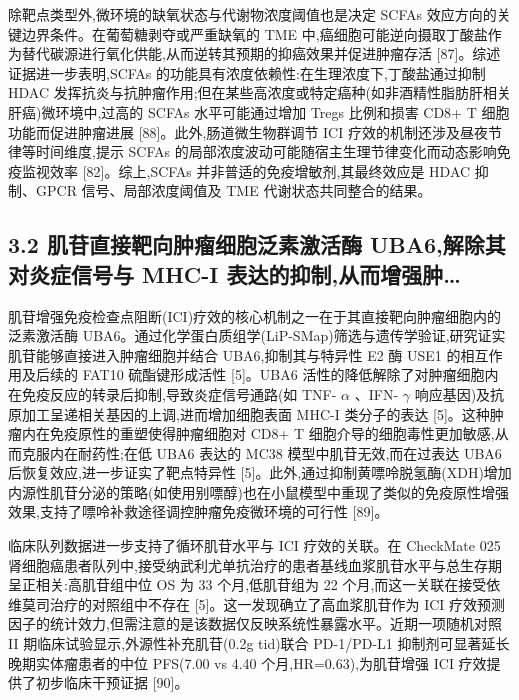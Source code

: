 \documentclass[11pt]{article}
\begin{document}
除靶点类型外,微环境的缺氧状态与代谢物浓度阈值也是决定 SCFAs 效应方向的关键边界条件。在葡萄糖剥夺或严重缺氧的 TME 中,癌细胞可能逆向摄取丁酸盐作为替代碳源进行氧化供能,从而逆转其预期的抑癌效果并促进肿瘤存活 {[}87{]}。综述证据进一步表明,SCFAs 的功能具有浓度依赖性:在生理浓度下,丁酸盐通过抑制 HDAC 发挥抗炎与抗肿瘤作用;但在某些高浓度或特定癌种(如非酒精性脂肪肝相关肝癌)微环境中,过高的 SCFAs 水平可能通过增加 Tregs 比例和损害 CD8+ T 细胞功能而促进肿瘤进展 {[}88{]}。此外,肠道微生物群调节 ICI 疗效的机制还涉及昼夜节律等时间维度,提示 SCFAs 的局部浓度波动可能随宿主生理节律变化而动态影响免疫监视效率 {[}82{]}。综上,SCFAs 并非普适的免疫增敏剂,其最终效应是 HDAC 抑制、GPCR 信号、局部浓度阈值及 TME 代谢状态共同整合的结果。

\subsection{3.2 肌苷直接靶向肿瘤细胞泛素激活酶 UBA6,解除其对炎症信号与 MHC-I 表达的抑制,从而增强肿\ldots{}}\label{ux808cux82f7ux76f4ux63a5ux9776ux5411ux80bfux7624ux7ec6ux80deux6cdbux7d20ux6fc0ux6d3bux9176-uba6ux89e3ux9664ux5176ux5bf9ux708eux75c7ux4fe1ux53f7ux4e0e-mhc-i-ux8868ux8fbeux7684ux6291ux5236ux4eceux800cux589eux5f3aux80bf}

肌苷增强免疫检查点阻断(ICI)疗效的核心机制之一在于其直接靶向肿瘤细胞内的泛素激活酶 UBA6。通过化学蛋白质组学(LiP-SMap)筛选与遗传学验证,研究证实肌苷能够直接进入肿瘤细胞并结合 UBA6,抑制其与特异性 E2 酶 USE1 的相互作用及后续的 FAT10 硫酯键形成活性 {[}5{]}。UBA6 活性的降低解除了对肿瘤细胞内在免疫反应的转录后抑制,导致炎症信号通路(如 TNF- \(\alpha\) 、IFN- \(\gamma\) 响应基因)及抗原加工呈递相关基因的上调,进而增加细胞表面 MHC-I 类分子的表达 {[}5{]}。这种肿瘤内在免疫原性的重塑使得肿瘤细胞对 CD8+ T 细胞介导的细胞毒性更加敏感,从而克服内在耐药性;在低 UBA6 表达的 MC38 模型中肌苷无效,而在过表达 UBA6 后恢复效应,进一步证实了靶点特异性 {[}5{]}。此外,通过抑制黄嘌呤脱氢酶(XDH)增加内源性肌苷分泌的策略(如使用别嘌醇)也在小鼠模型中重现了类似的免疫原性增强效果,支持了嘌呤补救途径调控肿瘤免疫微环境的可行性 {[}89{]}。

临床队列数据进一步支持了循环肌苷水平与 ICI 疗效的关联。在 CheckMate 025 肾细胞癌患者队列中,接受纳武利尤单抗治疗的患者基线血浆肌苷水平与总生存期呈正相关:高肌苷组中位 OS 为 33 个月,低肌苷组为 22 个月,而这一关联在接受依维莫司治疗的对照组中不存在 {[}5{]}。这一发现确立了高血浆肌苷作为 ICI 疗效预测因子的统计效力,但需注意的是该数据仅反映系统性暴露水平。近期一项随机对照 II 期临床试验显示,外源性补充肌苷(0.2g tid)联合 PD-1/PD-L1 抑制剂可显著延长晚期实体瘤患者的中位 PFS(7.00 vs 4.40 个月,HR=0.63),为肌苷增强 ICI 疗效提供了初步临床干预证据 {[}90{]}。
\end{document}
